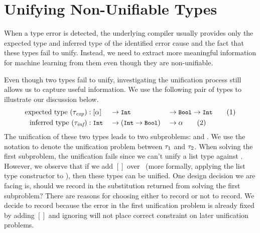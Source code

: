 \documentclass[12pt]{report}	%
\begin{document}
\section{Unifying Non-Unifiable Types}
\label{sec:features:unify}

When a type error is detected, the underlying compiler usually
provides only the expected type and inferred type of
the identified error cause and the fact that these types fail to
unify. Instead, we need
to extract more meaningful information for machine learning
from them even though they are
non-unifiable.

Even though two types fail to unify,  investigating the
unification process still allows us to capture useful information.
We use the following pair of types to illustrate our discussion below.
%
\begin{alignat*}{4}
\text{expected type}\ (\tau_{\textit{exp}}) &: [\alpha] && \to {\small\texttt{Int}}            && \to {\small\texttt{Bool}} \to {\small\texttt{Int}} \tag{1} \label{eq:expected}\\
\text{inferred type}\ (\tau_{\textit{inf}}) &: {\small\texttt{Int}}  && \to ({\small\texttt{Int}} \to {\small\texttt{Bool}}) && \to \alpha \tag{2} \label{eq:inferred}
\end{alignat*}
%
The unification of these two types leads to two subproblems:
\mui{[\tv]}{\Int} and \mui{\Int \to \Bool \to \Int}{\Int \to \Bool \to \tv}. We use
the notation  to denote the unification problem between $\tau_1$
and $\tau_2$.
%
When solving the first
subproblem, the unification fails since we can't unify a list type against
\Int. However, we observe that if we add $[]$ over \Int\ (more formally, applying the
list type constructor to \Int), then these types can be unified. One design
decision we are facing is, should we record \map{\tv}{\Int} in the substitution
returned from solving the first subproblem?
%
There are reasons for choosing either to record or not to record. We decide to record because
the error in the first unification problem is already fixed by adding $[]$
and ignoring \map{\tv}{\Int} will not place correct constraint on later
unification problems.
\end{document}
